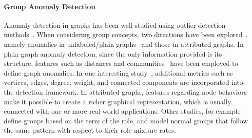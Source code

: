 \documentclass[twoside,leqno,twocolumn]{article}
\begin{document}
\paragraph{Group Anomaly Detection}
Anomaly detection in graphs has been well studied using outlier detection methods~\cite{akoglu2009anomaly}. When considering group concepts, two directions have been explored~\cite{akoglu2015graph}, namely anomalies in unlabeled/plain graphs~\cite{noble2003graph} and those in
attributed graphs. In plain graph anomaly detection, since the only information provided is its structure, features such as distances and communities~\cite{sun2005neighborhood} have been employed to define graph anomalies. In one interesting study~\cite{henderson2010metric}, additional metrics such as vertices, edges, degree, weight, and connected components are incorporated into the detection framework. In attributed graphs, features regarding node behaviors make it possible to create a richer graphical representation, which is usually connected with one or more real-world applications. Other studies, for example~\cite{yu2014glad} define groups based on the term of the role, and model normal groups that follow the same pattern with respect to their role mixture rates. %
\end{document}
